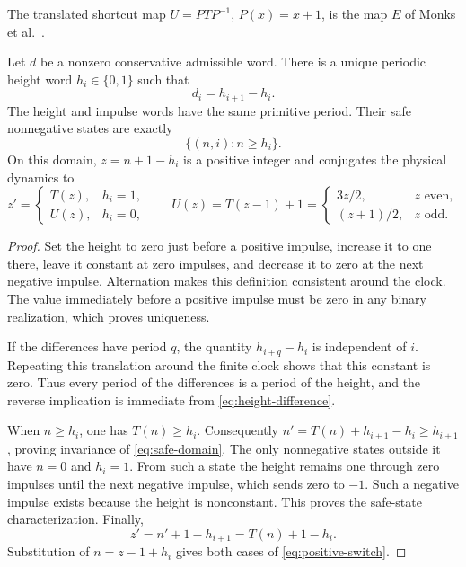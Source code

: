 The translated shortcut map $U=PTP^{-1}$, $P(x)=x+1$, is the map
$E$ of Monks et al.~\cite[\S~3]{monks-et-al-2013}.

\begin{proposition}
\label{prop:height-conjugacy}
Let $d$ be a nonzero conservative admissible word. There is a unique
periodic height word $h_i\in\{0,1\}$ such that
\begin{equation}\label{eq:height-difference}
 d_i=h_{i+1}-h_i.
\end{equation}
The height and impulse words have the same primitive period. Their
safe nonnegative states are exactly
\begin{equation}\label{eq:safe-domain}
 \{(n,i):n\ge h_i\}.
\end{equation}
On this domain, $z=n+1-h_i$ is a positive integer and conjugates the
physical dynamics to
\begin{equation}\label{eq:positive-switch}
 z'=\begin{cases}T(z),&h_i=1,\\ U(z),&h_i=0,
 \end{cases}
 \qquad
 U(z)=T(z-1)+1=
 \begin{cases}3z/2,&z\text{ even},\\(z+1)/2,&z\text{ odd}.
 \end{cases}
\end{equation}
\end{proposition}
\begin{proof}
Set the height to zero just before a positive impulse, increase it to
one there, leave it constant at zero impulses, and decrease it to zero
at the next negative impulse. Alternation makes this definition
consistent around the clock. The value immediately before a positive
impulse must be zero in any binary realization, which proves uniqueness.

If the differences have period $q$, the quantity $h_{i+q}-h_i$ is
independent of $i$. Repeating this translation around the finite
clock shows that this constant is zero. Thus every period of the
differences is a period of the height, and the reverse implication is
immediate from \eqref{eq:height-difference}.

When $n\ge h_i$, one has $T(n)\ge h_i$. Consequently
$n'=T(n)+h_{i+1}-h_i\ge h_{i+1}$, proving invariance of
\eqref{eq:safe-domain}. The only nonnegative states outside it have
$n=0$ and $h_i=1$. From such a state the height remains one through
zero impulses until the next negative impulse, which sends zero to
$-1$. Such a negative impulse exists because the height is
nonconstant. This proves the safe-state characterization. Finally,
\[
 z'=n'+1-h_{i+1}=T(n)+1-h_i.
\]
Substitution of $n=z-1+h_i$ gives both cases of
\eqref{eq:positive-switch}.
\end{proof}

